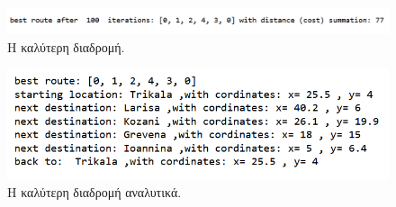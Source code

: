 \begin{figure}
    \centering
    \includegraphics[scale=0.58]{2947_thesis/pictures/best_route.png} 
    \caption{Η καλύτερη διαδρομή.}
    \label{best_route}
\end{figure}
\begin{figure}
    \centering
    \includegraphics[scale=0.80]{2947_thesis/pictures/best_route_explained.png} 
    \caption{Η καλύτερη διαδρομή αναλυτικά.}
    \label{best_route_explained}
\end{figure}

